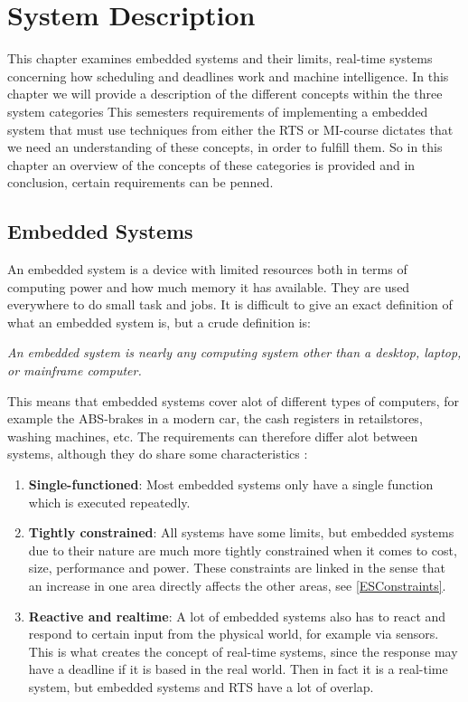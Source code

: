 \chapter{System Description}
This chapter examines embedded systems and their limits,
real-time systems concerning how scheduling and deadlines work and machine
intelligence.
In this chapter we will provide a description of the different concepts within the
three system categories
This semesters requirements of implementing a embedded system that must use techniques
from either the RTS or MI-course dictates that we need an understanding of these concepts,
in order to fulfill them. So in this chapter an overview of the concepts of these categories
is provided and in conclusion, certain requirements can be penned.



\section{Embedded Systems}
An embedded system is a device with limited resources both in terms of computing
power and how much memory it has available. They are used everywhere to do small task and
jobs. It is difficult to give an exact definition of what an embedded system is,
but a crude definition\citep[ch.1.1]{vahid1999embedded} is:\nl

\textit{An  embedded  system  is  nearly  any computing system other than a desktop,
laptop, or  mainframe  computer.}\nl

This means that embedded systems cover alot of different types of computers, for example
the ABS-brakes in a modern car, the cash registers in retailstores, washing machines, etc.
The requirements can therefore differ alot between systems, although they do
share some characteristics \Source:

\begin{enumerate}
  \item \textbf{Single-functioned}:  Most embedded systems only have a single
  function which is executed repeatedly.
  \item \textbf{Tightly constrained}: All systems have some limits, but embedded
  systems due to their nature are much more tightly constrained when it comes to
  cost, size, performance and power. These constraints are linked in the sense
  that an increase in one area directly affects the other areas, see
  \autoref{ESConstraints}.
  \item \textbf{Reactive and realtime}: A lot of embedded systems also has to
  react and respond to certain input from the physical world, for example via sensors.
  This is what creates the concept of real-time systems, since the response may have a deadline
  if it is based in the real world. Then in fact it is a real-time system, but embedded systems and
  RTS have a lot of overlap.
\end{enumerate}

